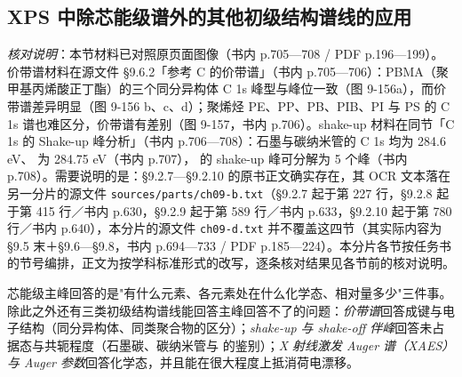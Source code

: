 
\subsection{XPS 中除芯能级谱外的其他初级结构谱线的应用}
\label{sec:ch09-otherlines}

\emph{核对说明}：本节材料已对照原页面图像（书内 p.705—708 / PDF p.196—199）。价带谱材料在源文件 §9.6.2「参考 C 的价带谱」（书内 p.705—706）：PBMA（聚甲基丙烯酸正丁酯）的三个同分异构体 C 1s 峰型与峰位一致（图 9-156a），而价带谱差异明显（图 9-156 b、c、d）；聚烯烃 PE、PP、PB、PIB、PI 与 PS 的 C 1s 谱也难区分，价带谱有差别（图 9-157，书内 p.706）。shake-up 材料在同节「C 1s 的 Shake-up 峰分析」（书内 p.706—708）：石墨与碳纳米管的 C 1s 均为 284.6 eV、 为 284.75 eV（书内 p.707）， 的 shake-up 峰可分解为 5 个峰（书内 p.708）。需要说明的是：§9.2.7—§9.2.10 的原书正文确实存在，其 OCR 文本落在另一分片的源文件 \texttt{sources/parts/ch09-b.txt}（§9.2.7 起于第 227 行，§9.2.8 起于第 415 行／书内 p.630，§9.2.9 起于第 589 行／书内 p.633，§9.2.10 起于第 780 行／书内 p.640），本分片的源文件 \texttt{ch09-d.txt} 并不覆盖这四节（其实际内容为 §9.5 末＋§9.6—§9.8，书内 p.694—733 / PDF p.185—224）。本分片各节按任务书的节号编排，正文为按学科标准形式的改写，逐条核对结果见各节前的核对说明。

\begin{probout}
芯能级主峰回答的是"有什么元素、各元素处在什么化学态、相对量多少"三件事。除此之外还有三类初级结构谱线能回答主峰回答不了的问题：\emph{价带谱}回答成键与电子结构（同分异构体、同类聚合物的区分）；\emph{shake-up 与 shake-off 伴峰}回答未占据态与共轭程度（石墨碳、碳纳米管与  的鉴别）；\emph{X 射线激发 Auger 谱（XAES）与 Auger 参数}回答化学态，并且能在很大程度上抵消荷电漂移。
\end{probout}

